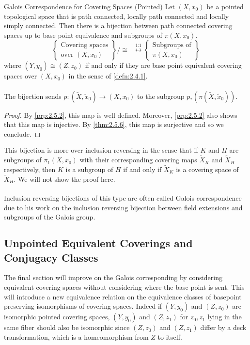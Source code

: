 \documentclass[a4paper]{article}
\begin{document}
\begin{thm}{Galois Correspondence for Covering Spaces (Pointed)}{} Let $(X,x_0)$ be a pointed topological space that is path connected, locally path connected and locally simply connected. Then there is a bijection between path connected covering spaces up to base point equivalence and subgroups of $\pi(X,x_0)$. $$\left\{\substack{\text{Covering spaces}\\\text{over }(X,x_0)}\right\}/\cong\;\;\overset{\text{1:1}}{\longleftrightarrow}\left\{\substack{\text{Subgroups of}\\ \pi(X,x_0)}\right\}$$ where $(Y,y_0)\cong(Z,z_0)$ if and only if they are base point equivalent covering spaces over $(X,x_0)$ in the sense of \ref{defn:2.4.1}. \\~\\

The bijection sends $p:(\tilde{X},\tilde{x}_0)\to(X,x_0)$ to the subgroup $p_\ast(\pi(\tilde{X},\tilde{x}_0))$. \tcbline
\begin{proof}
By \ref{prp:2.5.2}, this map is well defined. Moreover, \ref{prp:2.5.2} also shows that this map is injective. By \ref{thm:2.5.6}, this map is surjective and so we conclude. 
\end{proof}
\end{thm}

This bijection is more over inclusion reversing in the sense that if $K$ and $H$ are subgroups of $\pi_1(X,x_0)$ with their corresponding covering maps $\tilde{X}_K$ and $\tilde{X}_H$ respectively, then $K$ is a subgroup of $H$ if and only if $\tilde{X}_K$ is a covering space of $\tilde{X}_H$. We will not show the proof here. \\~\\

Inclusion reversing bijections of this type are often called Galois correspondence due to his work on the inclusion reversing bijection between field extensions and subgroups of the Galois group. 

\subsection{Unpointed Equivalent Coverings and Conjugacy Classes}
The final section will improve on the Galois corresponding by considering equivalent covering spaces without considering where the base point is sent. This will introduce a new equivalence relation on the equivalence classes of basepoint preserving isomorphisms of covering spaces. Indeed if $(Y,y_0)$ and $(Z,z_0)$ are isomorphic pointed covering spaces, $(Y,y_0)$ and $(Z,z_1)$ for $z_0,z_1$ lying in the same fiber should also be isomorphic since $(Z,z_0)$ and $(Z,z_1)$ differ by a deck transformation, which is a homeomorphism from $Z$ to itself. \\~\\
\end{document}
